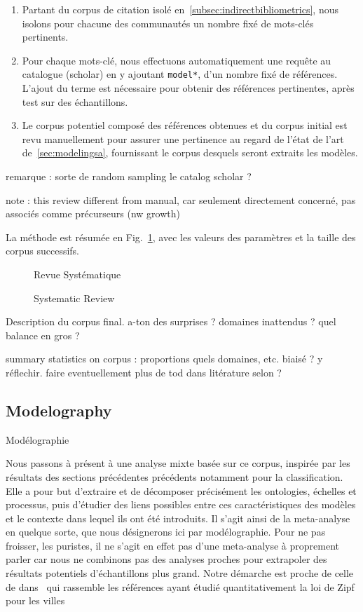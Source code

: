 \begin{enumerate}
\item Partant du corpus de citation isolé en~\ref{subsec:indirectbibliometrics}, nous isolons pour chacune des communautés un nombre fixé de mots-clés pertinents.
\item Pour chaque mots-clé, nous effectuons automatiquement une requête au catalogue (scholar) en y ajoutant \texttt{model*}, d'un nombre fixé de références. L'ajout du terme est nécessaire pour obtenir des références pertinentes, après test sur des échantillons.
\item Le corpus potentiel composé des références obtenues et du corpus initial est revu manuellement pour assurer une pertinence au regard de l'état de l'art de~\ref{sec:modelingsa}, fournissant le corpus desquels seront extraits les modèles.
\end{enumerate}

remarque : sorte de random sampling le catalog scholar ?

note : this review different from manual, car seulement directement concerné, pas associés comme précurseurs (nw growth)

La méthode est résumée en Fig.~\ref{fig:modelography:systematicreview}, avec les valeurs des paramètres et la taille des corpus successifs. 


\begin{figure}
%
\caption{Systematic Review}{Revue Systématique}
\label{fig:modelography:systematicreview}
\end{figure}


Description du corpus final. a-ton des surprises ? domaines inattendus ? quel balance en gros ?

summary statistics on corpus : proportions quels domaines, etc. biaisé ? y réflechir. faire eventuellement plus de tod dans litérature selon ?




\subsection{Modelography}{Modélographie}


Nous passons à présent à une analyse mixte basée sur ce corpus, inspirée par les résultats des sections précédentes précédents notamment pour la classification. Elle a pour but d'extraire et de décomposer précisément les ontologies, échelles et processus, puis d'étudier des liens possibles entre ces caractéristiques des modèles et le contexte dans lequel ils ont été introduits. Il s'agit ainsi de la meta-analyse en quelque sorte, que nous désignerons ici par modélographie. Pour ne pas froisser, les puristes, il ne s'agit en effet pas d'une meta-analyse à proprement parler car nous ne combinons pas des analyses proches pour extrapoler des résultats potentiels d'échantillons plus grand. Notre démarche est proche de celle de  dans~\cite{2016arXiv160606162C} qui rassemble les références ayant étudié quantitativement la loi de Zipf pour les villes


